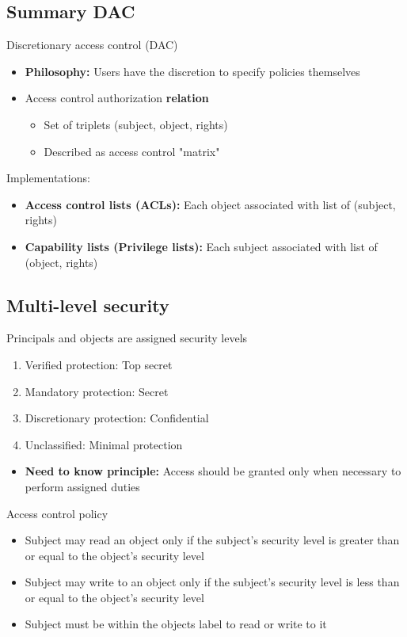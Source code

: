 \documentclass[12pt,a4paper]{article}
\begin{document}
\subsection{Summary DAC}
Discretionary access control (DAC) 
\begin{itemize}
    \item \textbf{Philosophy:} Users have the discretion to specify policies themselves
    \item Access control authorization \textbf{relation}
    \begin{itemize}
        \item Set of triplets (subject, object, rights)
        \item Described as access control "matrix"
    \end{itemize}
\end{itemize}

Implementations:
\begin{itemize}
    \item \textbf{Access control lists (ACLs):} Each object associated with list of (subject, rights)
    \item \textbf{Capability lists (Privilege lists):} Each subject associated with list of (object, rights)
\end{itemize}

\subsection{Multi-level security}
Principals and objects are assigned security levels
\begin{enumerate}
    \item Verified protection: Top secret
    \item Mandatory protection: Secret
    \item Discretionary protection: Confidential
    \item Unclassified: Minimal protection  
\end{enumerate}
\begin{itemize}
    \item \textbf{Need to know principle:} Access should be granted only when necessary to perform assigned duties
\end{itemize}
Access control policy 
\begin{itemize}
    \item Subject may read an object only if the subject's security level is greater than or equal to the object's security level
    \item Subject may write to an object only if the subject's security level is less than or equal to the object's security level
    \item Subject must be within the objects label to read or write to it
\end{itemize}
\end{document}
